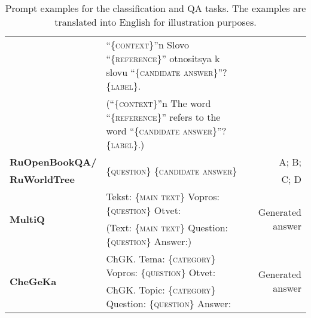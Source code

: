 \documentclass[11pt]{article}
\begin{document}
\begin{table*}[hb!]
{\begin{tabular}{llr}
    &  ``\textsc{\{context\}}''n Slovo ``\textsc{\{reference\}}'' otnositsya k slovu ``\textsc{\{candidate answer\}}''? \textsc{\{label\}}. & \\  
    &  (``\textsc{\{context\}}''n The word ``\textsc{\{reference\}}'' refers to the word ``\textsc{\{candidate answer\}}''? \textsc{\{label\}}.) & \\ \midrule
    
    \textbf{RuOpenBookQA/} &
    \multirow{2}{*}{\textsc{\{question\}} \textsc{\{candidate answer\}}}  & A; B;  \\ 
    \textbf{RuWorldTree} & & C; D
    \\ \midrule
  
    \multirow{2}{*}{\textbf{MultiQ}} & Tekst: \textsc{\{main text\}} Vopros: \textsc{\{question\}} Otvet: & \multirow{2}{*}{Generated answer}\\
    & (Text: \textsc{\{main text\}} Question: \textsc{\{question\}} Answer:) &
    \\ \midrule
    
    \multirow{2}{*}{\textbf{CheGeKa}} & ChGK. Tema: \textsc{\{category\}} Vopros: \textsc{\{question\}} Otvet: & \multirow{2}{*}{Generated answer}\\
    & ChGK. Topic: \textsc{\{category\}} Question: \textsc{\{question\}} Answer:& 
    \\ \bottomrule
    \end{tabular}
    }
    \caption{Prompt examples for the classification and QA tasks. The examples are translated into English for illustration purposes.}
    \label{tab:main_prompts}

\end{table*}
\end{document}
